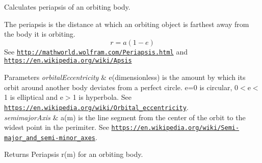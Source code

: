 Calculates periapsis of an orbiting body. 

The periapsis is the distance at which an orbiting object is farthest away from the body it is orbiting. \[r=a(1-e)\] See \href{http://mathworld.wolfram.com/Periapsis.html}{\tt http\+://mathworld.\+wolfram.\+com/\+Periapsis.\+html} and \href{https://en.wikipedia.org/wiki/Apsis}{\tt https\+://en.\+wikipedia.\+org/wiki/\+Apsis}


\begin{DoxyParams}{Parameters}
{\em orbital\+Eccentricity} & e(dimensionless) is the amount by which its orbit around another body deviates from a perfect circle. e=0 is circular, 0$<$e$<$1 is elliptical and e$>$1 is hyperbola. See \href{https://en.wikipedia.org/wiki/Orbital_eccentricity}{\tt https\+://en.\+wikipedia.\+org/wiki/\+Orbital\+\_\+eccentricity}. \\
\hline
{\em semimajor\+Axis} & a(m) is the line segment from the center of the orbit to the widest point in the perimiter. See \href{https://en.wikipedia.org/wiki/Semi-major_and_semi-minor_axes}{\tt https\+://en.\+wikipedia.\+org/wiki/\+Semi-\/major\+\_\+and\+\_\+semi-\/minor\+\_\+axes}. \\
\hline
\end{DoxyParams}
\begin{DoxyReturn}{Returns}
Periapsis r(m) for an orbiting body. 
\end{DoxyReturn}
